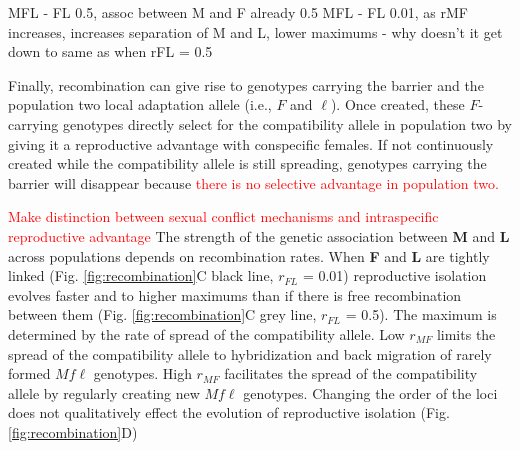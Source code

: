\documentclass[11pt]{article}
\begin{document}
MFL - FL 0.5, assoc between M and F already 0.5
MFL - FL 0.01, as rMF increases, increases separation of M and L, lower maximums - why doesn't it get down to same as when rFL = 0.5

 Finally, recombination can give rise to genotypes carrying the barrier  and the population two local adaptation allele (i.e., $F$ and $\ell$). Once created, these $F$-carrying genotypes directly select for the compatibility allele in population two by giving it a reproductive advantage with conspecific females. If not continuously created while the compatibility allele is still spreading, genotypes carrying the barrier will disappear because \textcolor{red}{there is no selective advantage in population two.} 

\textcolor{red}{Make distinction between sexual conflict mechanisms and intraspecific reproductive advantage}
The strength of the genetic association between \textbf{M} and \textbf{L} across populations depends on recombination rates. When \textbf{F} and \textbf{L} are tightly linked (Fig. \ref{fig:recombination}C black line, $r_{FL}$ = 0.01) reproductive isolation evolves faster and to higher maximums than if there is free recombination between them (Fig. \ref{fig:recombination}C grey line, $r_{FL}$ = 0.5). The maximum is determined by the rate of spread of the compatibility allele.   Low $r_{MF}$ limits the spread of the compatibility allele to hybridization and back migration of rarely formed $Mf\ell$ genotypes. High $r_{MF}$ facilitates the spread of the compatibility allele by regularly creating new $Mf\ell$ genotypes. Changing the order of the loci does not qualitatively effect the evolution of reproductive isolation (Fig. \ref{fig:recombination}D)

\end{document}
